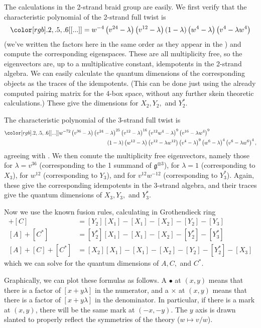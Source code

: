 \documentclass[12pt]{amsart}
\begin{document}
The calculations in the 2-strand braid group are easily.
We first verify that the characteristic polynomial of the 2-strand full twist is 
$$
\nn{...} = w^{-4} \left(v^{24}-\lambda \right) \left(v^{12}-\lambda \right) (1- \lambda )   \left(w^4-\lambda \right) \left(v^4-\lambda  w^4\right)
$$
(we've written the factors here in the same order as they appear in the )
and compute the corresponding eigenspaces. These are all multiplicity free, so the eigenvectors are, up to a multiplicative constant, idempotents in the 2-strand algebra. We can easily calculate the quantum dimensions of the corresponding objects as the traces of the idempotents. (This can be done just using the already computed pairing matrix for the 4-box space, without any further skein theoretic calculations.) These give the dimensions for $X_2, Y_2,$ and $Y_2^*$.

The characteristic polynomial of the 3-strand full twist is
\begin{align*}
\nn{...}
w^{-72}
\left(v^{36}-\lambda \right)
\left(v^{24}-\lambda \right)^{25}
\left(v^{12}-\lambda \right)^{16}  
& \left(v^{12} w^4-\lambda \right)^9
\left(v^{16}-\lambda  w^4\right)^9 \\
\left(1 - \lambda\right)
\left(w^{12}-\lambda \right) 
&\left(v^{12}-\lambda  w^{12}\right)
\left(v^4-\lambda \right)^9 
\left(w^6-\lambda \right)^4  
\left(v^6-\lambda  w^6\right)^4, 
\end{align*}
agreeing with .
We then comute the multiplicity free eigenvectors, namely those for $\lambda = v^{36}$ (corresponding to the 1 summand of $\mathfrak{g}^{\otimes 3}$), for $\lambda = 1$ (corresponding to $X_3$), for $w^{12}$ (corresponding to $Y_3$), and for $v^{12}w^{-12}$ (corresponding to $Y_3^*$). Again, these give the corresponding idempotents in the 3-strand algebra, and their traces give the quantum dimensions of $X_3, Y_3,$ and $Y_3^*$.

Now we use the known fusion rules, calculating in Grothendieck ring
\begin{align*}
[A] + [C]
& =
[Y_2] [X_1] - [X_1] - [X_2] - [Y_2] - [Y_3] \\
[A] + [C^*]
& =
[Y_2^*] [X_1] - [X_1] - [X_2] - [Y_2^*] - [Y_3^*] \\
[A] + [C] + [C^*]
& =
[X_2] [X_1] - [X_1] - [X_2] - [Y_2] - [Y_2^*] - [X_3]
\end{align*}
which we can solve for the quantum dimensions of $A, C,$ and $C^*$.


Graphically, we can plot these formulas as follows. A $\bullet$ at
$(x,y)$ means that there is a factor of $[x+y\lambda]$ in the
numerator, and a $\times$ at $(x,y)$ means that there is a factor of
$[x+y\lambda]$ in the denominator. In particular, if there is a mark
at $(x,y)$, there will be the same mark at $(-x,-y)$. The $y$ axis is
drawn slanted to properly reflect the symmetries of the theory
($w \mapsto v/w$).
\end{document}

